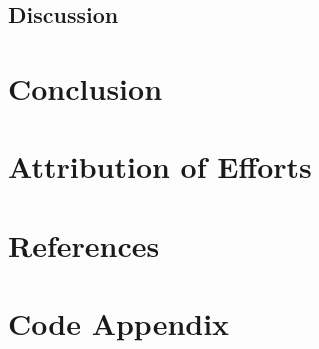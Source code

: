\documentclass[12pt]{article}
\begin{document}
\subsection{Discussion}

\section{Conclusion} 
\paragraph{}

\section{Attribution of Efforts} 
\paragraph{}

\section{References} 
\paragraph{}

\section{Code Appendix} 
\paragraph{}
\end{document}
